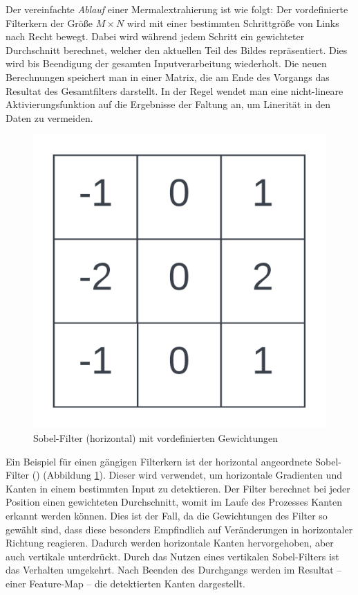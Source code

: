 Der vereinfachte \textit{Ablauf} einer Mermalextrahierung ist wie folgt: Der vordefinierte Filterkern der Größe $M \times N$ wird mit einer bestimmten Schrittgröße von Links nach Recht bewegt. Dabei wird während jedem Schritt ein gewichteter Durchschnitt berechnet, welcher den aktuellen Teil des Bildes repräsentiert. Dies wird bis Beendigung der gesamten Inputverarbeitung wiederholt. Die neuen Berechnungen speichert man in einer Matrix, die am Ende des Vorgangs das Resultat des Gesamtfilters darstellt. In der Regel wendet man eine nicht-lineare Aktivierungsfunktion auf die Ergebnisse der Faltung an, um Linerität in den Daten zu vermeiden.
\begin{figure}[H]
	\centering
	\includegraphics[width=0.2\linewidth]{Bilder/sobelfilter.png}
	\caption{Sobel-Filter (horizontal) mit vordefinierten Gewichtungen}
	\label{img:sobel}
\end{figure}
Ein Beispiel für einen gängigen Filterkern ist der horizontal angeordnete Sobel-Filter (\cite{kanopoulos_design_1988}) (Abbildung \ref{img:sobel}). Dieser wird verwendet, um horizontale Gradienten und Kanten in einem bestimmten Input zu detektieren. Der Filter berechnet bei jeder Position einen gewichteten Durchschnitt, womit im Laufe des Prozesses Kanten erkannt werden können. Dies ist der Fall, da die Gewichtungen des Filter so gewählt sind, dass diese besonders Empfindlich auf Veränderungen in horizontaler Richtung reagieren. Dadurch werden horizontale Kanten hervorgehoben, aber auch vertikale unterdrückt. Durch das Nutzen eines vertikalen Sobel-Filters ist das Verhalten umgekehrt. Nach Beenden des Durchgangs werden im Resultat -- einer Feature-Map -- die detektierten Kanten dargestellt.